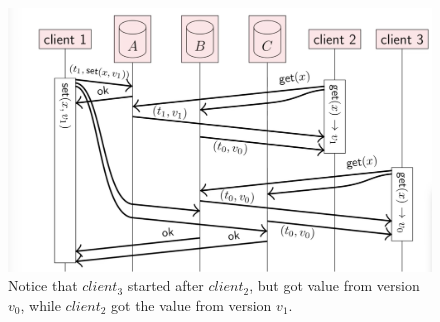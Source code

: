 \begin{figure}[t]
    \centering
    \includegraphics[scale=0.25]{computer-sceince/distributed-media/linearization-failure.png}
    \caption{Notice that $client_3$ started after $client_2$, but got value
    from version $v_0$, while $client_2$ got the value from version $v_1$.
    }
\end{figure}


